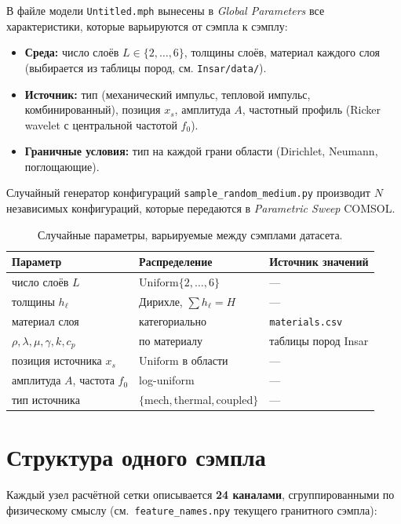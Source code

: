 \documentclass[12pt]{article}
\begin{document}
В файле модели \texttt{Untitled.mph} вынесены в \emph{Global Parameters}
все характеристики, которые варьируются от сэмпла к сэмплу:
\begin{itemize}[leftmargin=1.4em,itemsep=2pt]
\item \textbf{Среда:} число слоёв $L\in\{2,\dots,6\}$, толщины слоёв,
      материал каждого слоя (выбирается из таблицы пород,
      см. \texttt{Insar/data/}).
\item \textbf{Источник:} тип (механический импульс, тепловой импульс,
      комбинированный), позиция $x_s$, амплитуда $A$, частотный профиль
      (Ricker wavelet с центральной частотой $f_0$).
\item \textbf{Граничные условия:} тип на каждой грани области
      (Dirichlet, Neumann, поглощающие).
\end{itemize}
Случайный генератор конфигураций \texttt{sample\_random\_medium.py}
производит $N$ независимых конфигураций, которые передаются в
\textit{Parametric Sweep} COMSOL.

\begin{table}[h]
\centering
\small
\begin{tabular}{lll}
\toprule
\textbf{Параметр} & \textbf{Распределение} & \textbf{Источник значений}\\
\midrule
число слоёв $L$ & $\mathrm{Uniform}\{2,\dots,6\}$ & ---\\
толщины $h_\ell$ & Дирихле, $\sum h_\ell = H$ & ---\\
материал слоя & категориально & \texttt{materials.csv}\\
$\rho,\lambda,\mu,\gamma,k,c_p$ & по материалу & таблицы пород Insar\\
позиция источника $x_s$ & $\mathrm{Uniform}$ в области & ---\\
амплитуда $A$, частота $f_0$ & log-uniform & ---\\
тип источника & $\{$mech,\,thermal,\,coupled$\}$ & ---\\
\bottomrule
\end{tabular}
\caption{Случайные параметры, варьируемые между сэмплами датасета.}
\end{table}

\section{Структура одного сэмпла}

Каждый узел расчётной сетки описывается \textbf{24 каналами},
сгруппированными по физическому смыслу
(см.~\texttt{feature\_names.npy} текущего гранитного сэмпла):
\end{document}
